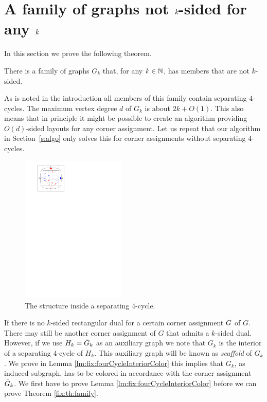 
\section{A family of graphs not $\emph{k}$-sided for any $\emph{k}$}
\thispagestyle{plain}
  \label{s:fix}
  In this section we prove the following theorem.

  \begin{thrm}
    \label{fix:th:family}
      There is a family of graphs $G_k$ that, for any $k \in \mathbb{N}$, has members that are not $k$-sided.
  \end{thrm}

  As is noted in the introduction all members of this family contain separating $4$-cycles. The maximum vertex degree $d$ of $G_k$ is about $2k+O(1)$. This also means that in principle it might be possible to create an algorithm providing $O(d)$-sided layouts for any corner assignment. Let us repeat that our algorithm in Section~\ref{s:algo} only solves this for corner assignments without separating $4$-cycles.

  \begin{figure}
    \centering
    \includegraphics[width=5cm]{fixExtension/img/sep4cycle.pdf}
    \caption{The structure inside a separating $4$-cycle.}
    \label{fig:fix:sep4cycle}
  \end{figure}

  If there is no $k$-sided rectangular dual for a certain corner assignment $\bar{G}$ of $G$. There may still be another corner assignment of $G$ that admits a $k$-sided dual.
  However, if we use $ H_k = \bar{G}_k$ as an auxiliary graph we note that $G_k$ is the interior of a separating $4$-cycle of $H_k$. This auxiliary graph will be known as \emph{scaffold} of $G_k$.
  We prove in Lemma \ref{lm:fix:fourCycleInteriorColor} this implies that $G_k$, as induced subgraph, has to be colored in accordance with the corner assignment $\bar{G}_k$.
  We first have to prove Lemma \ref{lm:fix:fourCycleInteriorColor} before we can prove Theorem \ref{fix:th:family}.

